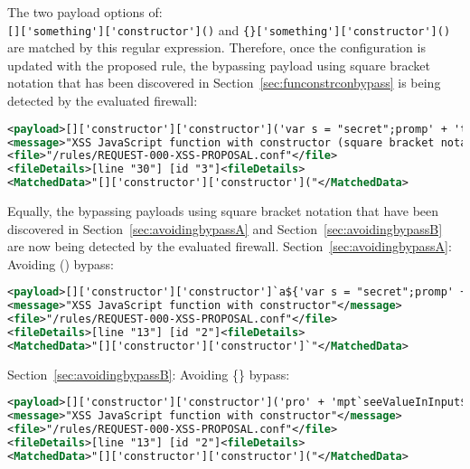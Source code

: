 The two payload options of: \\
\verb|[]['something']['constructor']()| and \verb|{}['something']['constructor']()| \\
are matched by this regular expression. Therefore, once the configuration is updated with the proposed rule, the bypassing payload using square bracket notation that has been discovered in Section~\ref{sec:funconstrconbypass} is being detected by the evaluated firewall:

\begin{lstlisting}[style=ruleStyle, language=XML, caption=function constructor bypass payload using square bracket notation blocked, label={lst:constructorsblockedsbn}]
<payload>[]['constructor']['constructor']('var s = "secret";promp' + 't("something", s)')()</payload>
<message>"XSS JavaScript function with constructor (square bracket notation)"</message>
<file>"/rules/REQUEST-000-XSS-PROPOSAL.conf"</file>
<fileDetails>[line "30"] [id "3"]<fileDetails>
<MatchedData>"[]['constructor']['constructor']("</MatchedData>
\end{lstlisting}

Equally, the bypassing payloads using square bracket notation that have been discovered in Section~\ref{sec:avoidingbypassA} and  Section~\ref{sec:avoidingbypassB} are now being detected by the evaluated firewall. Section~\ref{sec:avoidingbypassA}: Avoiding () bypass:

\begin{lstlisting}[style=ruleStyle, language=XML, caption=avoiding () bypass payload using square bracket notation blocked, label={lst:constructorsblockedsbnA}]
<payload>[]['constructor']['constructor']`a${'var s = "secret";promp' + 't`something\u{0024}{s}`'}```</payload>
<message>"XSS JavaScript function with constructor"</message>
<file>"/rules/REQUEST-000-XSS-PROPOSAL.conf"</file>
<fileDetails>[line "13"] [id "2"]<fileDetails>
<MatchedData>"[]['constructor']['constructor']`"</MatchedData>
\end{lstlisting}

Section~\ref{sec:avoidingbypassB}: Avoiding \{\} bypass:

\begin{lstlisting}[style=ruleStyle, language=XML, caption=avoiding \{\} bypass payload using square bracket notation blocked, label={lst:constructorsblockedsbnB}]
<payload>[]['constructor']['constructor']('pro' + 'mpt`seeValueInInput$' + [open + []][0][16] + '2+2' + [open + []][0][36] + ':`')();</payload>
<message>"XSS JavaScript function with constructor"</message>
<file>"/rules/REQUEST-000-XSS-PROPOSAL.conf"</file>
<fileDetails>[line "13"] [id "2"]<fileDetails>
<MatchedData>"[]['constructor']['constructor']("</MatchedData>
\end{lstlisting}

